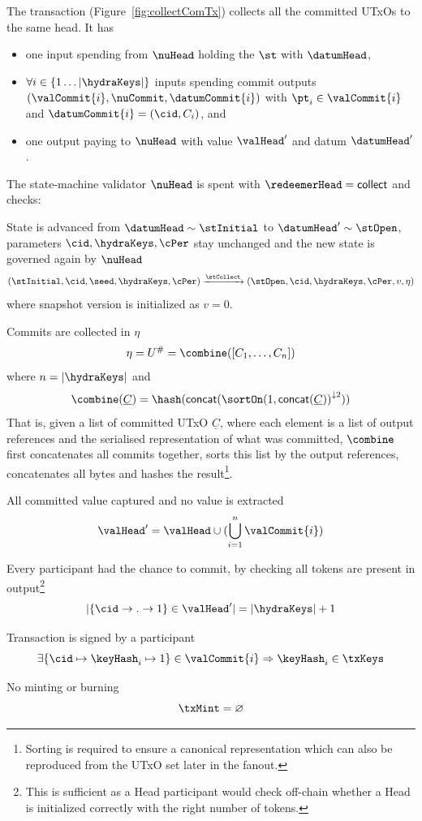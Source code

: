 \noindent The \mtxCCom{} transaction (Figure~\ref{fig:collectComTx}) collects
all the committed UTxOs to the same head. It has
\begin{itemize}
	\item one input spending from $\nuHead$ holding the $\st$ with $\datumHead$,
	\item $\forall i \in \{1 \dots |\hydraKeys|\}$ inputs spending commit outputs
	      $(\valCommit{i}, \nuCommit, \datumCommit{i})$ with $\pt_{i} \in \valCommit{i}$
	      and $\datumCommit{i} = (\cid, C_{i})$, and
	\item one output paying to $\nuHead$ with value $\valHead'$ and
	      datum $\datumHead'$.
\end{itemize}

\noindent The state-machine validator $\nuHead$ is spent with
$\redeemerHead = \mathsf{collect}$ and checks:
\begin{menumerate}
	\item State is advanced from $\datumHead \sim \stInitial$ to
	$\datumHead' \sim \stOpen$, parameters $\cid,\hydraKeys,\cPer$ stay
	unchanged and the new state is governed again by $\nuHead$
	\[
		(\stInitial,\cid,\seed,\hydraKeys,\cPer) \xrightarrow{\stCollect} (\stOpen,\cid,\hydraKeys,\cPer,v,\eta)
	\]
	where snapshot version is initialized as $v = 0$.
	\item Commits are collected in $\eta$
	\[
		\eta = U^{\#} = \combine([C_{1}, \dots, C_{n}])
	\]
	where $n = |\hydraKeys|$ and
	\[
		\combine(\underline{C}) = \hash(\mathsf{concat}({\sortOn(1, \mathsf{concat}(\underline{C}))}^{\downarrow2}))
	\]
	That is, given a list of committed UTxO $\underline{C}$, where each element is
	a list of output references and the serialised representation of what was
	committed, $\combine$ first concatenates all commits together, sorts this list
	by the output references, concatenates all bytes and hashes the
	result\footnote{Sorting is required to ensure a canonical representation which
		can also be reproduced from the UTxO set later in the fanout.}.

	\item All committed value captured and no value is extracted
	\[
		\valHead' = \valHead \cup (\bigcup_{i=1}^{n} \valCommit{i})
	\]
	\item Every participant had the chance to commit, by checking all tokens are
	present in output\footnote{This is sufficient as a Head participant would
		check off-chain whether a Head is initialized correctly with the right
		number of tokens.}
	\[
		|\{\cid \rightarrow . \rightarrow 1\} \in \valHead'| = |\hydraKeys| + 1
	\]
	\item Transaction is signed by a participant
	\[
		\exists \{\cid \mapsto \keyHash_{i} \mapsto 1\} \in \valCommit{i} \Rightarrow \keyHash_{i} \in \txKeys
	\]
	\item No minting or burning
	\[
		\txMint = \varnothing
	\]
\end{menumerate}

